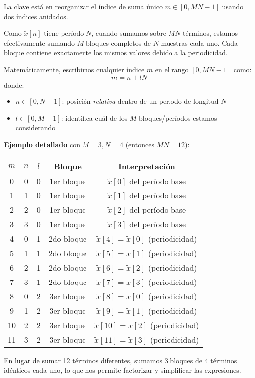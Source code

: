 \documentclass[
  11pt,
  letterpaper,
   addpoints,
   answers
  ]{exam}
\begin{document}
\begin{questions}
\begin{solution}
La clave está en reorganizar el índice de suma único $m \in [0, MN-1]$ usando dos índices anidados. 

Como $\tilde{x}[n]$ tiene período $N$, cuando sumamos sobre $MN$ términos, estamos efectivamente sumando $M$ bloques completos de $N$ muestras cada uno. Cada bloque contiene exactamente los mismos valores debido a la periodicidad.

Matemáticamente, escribimos cualquier índice $m$ en el rango $[0, MN-1]$ como:
$$m = n + lN$$
donde:
\begin{itemize}
\item $n \in [0, N-1]$: posición \textit{relativa} dentro de un período de longitud $N$
\item $l \in [0, M-1]$: identifica cuál de los $M$ bloques/períodos estamos considerando
\end{itemize}

\textbf{Ejemplo detallado} con $M=3, N=4$ (entonces $MN=12$):

\begin{center}
\begin{tabular}{|c|c|c|c|c|}
\hline
$m$ & $n$ & $l$ & Bloque & Interpretación \\
\hline
0 & 0 & 0 & 1er bloque & $\tilde{x}[0]$ del período base \\
1 & 1 & 0 & 1er bloque & $\tilde{x}[1]$ del período base \\
2 & 2 & 0 & 1er bloque & $\tilde{x}[2]$ del período base \\
3 & 3 & 0 & 1er bloque & $\tilde{x}[3]$ del período base \\
\hline
4 & 0 & 1 & 2do bloque & $\tilde{x}[4] = \tilde{x}[0]$ (periodicidad) \\
5 & 1 & 1 & 2do bloque & $\tilde{x}[5] = \tilde{x}[1]$ (periodicidad) \\
6 & 2 & 1 & 2do bloque & $\tilde{x}[6] = \tilde{x}[2]$ (periodicidad) \\
7 & 3 & 1 & 2do bloque & $\tilde{x}[7] = \tilde{x}[3]$ (periodicidad) \\
\hline
8 & 0 & 2 & 3er bloque & $\tilde{x}[8] = \tilde{x}[0]$ (periodicidad) \\
9 & 1 & 2 & 3er bloque & $\tilde{x}[9] = \tilde{x}[1]$ (periodicidad) \\
10 & 2 & 2 & 3er bloque & $\tilde{x}[10] = \tilde{x}[2]$ (periodicidad) \\
11 & 3 & 2 & 3er bloque & $\tilde{x}[11] = \tilde{x}[3]$ (periodicidad) \\
\hline
\end{tabular}
\end{center}
En lugar de sumar 12 términos diferentes, sumamos 3 bloques de 4 términos idénticos cada uno, lo que nos permite factorizar y simplificar las expresiones.


\end{solution}
\end{questions}
\end{document}
